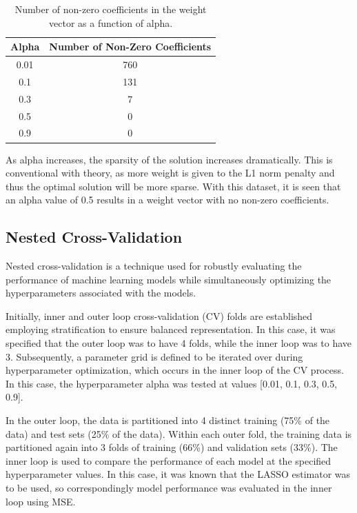 \documentclass[12pt]{article}
\begin{document}
\begin{table}[H]
    \centering
    \begin{tabular}{|c|c|}
        \hline 
        \textbf{Alpha} & \textbf{Number of Non-Zero Coefficients} \\
        \hline
        0.01 & 760 \\
        0.1 & 131 \\
        0.3 & 7 \\
        0.5 & 0 \\
        0.9 & 0 \\
        \hline
    \end{tabular}
    \caption{Number of non-zero coefficients in the weight vector as a function of alpha.}
    \label{tab:lasso_alpha}
\end{table}

\vspace{-0.5cm}

As alpha increases, the sparsity of the solution increases dramatically. This is conventional with theory, as more weight is given to the L1 norm penalty and thus the optimal solution will be more sparse. With this dataset, it is seen that an alpha value of 0.5 results in a weight vector with no non-zero coefficients. 

\subsection{Nested Cross-Validation}
Nested cross-validation is a technique used for robustly evaluating the performance of machine learning models while simultaneously optimizing the hyperparameters associated with the models. 

Initially, inner and outer loop cross-validation (CV) folds are established employing stratification to ensure balanced representation. In this case, it was specified that the outer loop was to have 4 folds, while the inner loop was to have 3. Subsequently, a parameter grid is defined to be iterated over during hyperparameter optimization, which occurs in the inner loop of the CV process. In this case, the hyperparameter alpha was tested at values [0.01, 0.1, 0.3, 0.5, 0.9].

In the outer loop, the data is partitioned into 4 distinct training (75\% of the data) and test sets (25\% of the data). Within each outer fold, the training data is partitioned again into 3 folds of training (66\%) and validation sets (33\%). The inner loop is used to compare the performance of each model at the specified hyperparameter values. In this case, it was known that the LASSO estimator was to be used, so correspondingly model performance was evaluated in the inner loop using MSE. 
\end{document}
